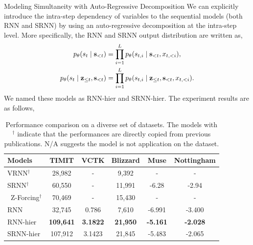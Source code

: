\documentclass[final]{beamer}
\newlength{\colwidth}
\begin{document}
\begin{frame}[t]
\begin{columns}[t]
\begin{column}{\colwidth}
  \begin{block}{Modeling Simultaneity with Auto-Regressive Decomposition}
	We can explicitly introduce the intra-step dependency of variables to the sequential models (both RNN and SRNN) by using an auto-regressive decomposition at the intra-step level. More specifically, the RNN and SRNN output distribution are written as,
	\begin{align}
	\label{eqn:ar_rnn_out_dist}
	p_\theta(s_t \mid {\mathbf{s}}_{<t})
	&= \prod_{i=1}^{L} p_{\theta}(s_{t,i} \mid {\mathbf{s}}_{<t}, x_{t,<i}), \\
	\label{eqn:ar_srnn_out_dist}
	p_\theta(s_t \mid {\mathbf{z}}_{\le t}, {\mathbf{s}}_{<t})
	&= \prod_{i=1}^{L} p_{\theta}(s_{t,i} \mid {\mathbf{z}}_{\le t}, {\mathbf{s}}_{<t}, x_{t,<i}).
	\end{align}
	We named these models as RNN-hier and SRNN-hier. The experiment results are as follows,
	\begin{table}[!t]
		\centering
		\small
			\begin{tabular}{l|c c c | c c }
				\toprule
				\bf Models          & \bf TIMIT & \bf VCTK  & \bf Blizzard  & \bf Muse  & \bf Nottingham \\
				\midrule
				VRNN$^\dagger$\cite{chung2015recurrent}      & 28,982      & -          & 9,392      &  -         &  -      \\
				SRNN$^\dagger$\cite{fraccaro2016sequential}      & 60,550      & -          & 11,991     &  -6.28     &  -2.94     \\\
				Z-Forcing$^\dagger$\cite{goyal2017z}  & 70,469 & -          & 15,430     &  -         &  -       \\
				\midrule
				RNN               & 32,745      & 0.786      & 7,610     & -6.991     & -3.400     \\
				\midrule\midrule
				RNN-hier            & \textbf{109,641}     & \textbf{3.1822}     & \textbf{21,950}     & \textbf{-5.161} & \textbf{-2.028} \\
				SRNN-hier           & 107,912     & 3.1423     & 21,845     & -5.483     & -2.065    \\
				\bottomrule
			\end{tabular}
		\caption{Performance comparison on a diverse set of datasets. The models with $^\dagger$ indicate that the performances are directly copied from previous publications. N/A suggests the model is not application on the dataset. }
		\label{tab:non_factorized}
		\vspace{-1.5em}
	\end{table}
	\vspace{-1.0em}

\end{block}
\end{column}
\end{columns}
\end{frame}
\end{document}
